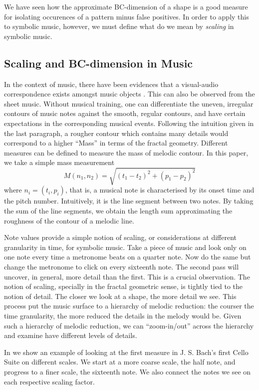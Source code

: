   We have seen how the approximate BC-dimension of a shape is a good
measure for isolating occurences of a pattern minus false positives.
In order to apply this to symbolic music, however, we must define what
do we mean by \emph{scaling} in symbolic music.

\subsection{Scaling and BC-dimension in Music}
In the context of music, there have been evidences that a visual-audio correspondence exists amongst music objects \cite{thorpe2016perception}.
This can also be observed from the sheet music.
Without musical training, one can differentiate the uneven, irregular contours of music notes against the smooth, regular contours, and have certain expectations in the corresponding musical events.
Following the intuition given in the last paragraph, a rougher contour which contains many details would correspond to a higher ``Mass'' in terms of the fractal geometry.
Different measures can be defined to measure the mass of melodic contour.
In this paper, we take a simple mass measurement
$$M(n_1, n_2) = \sqrt{(t_1-t_2)^2 +(p_1-p_2)^2}$$
  where $n_i=(t_i, p_i)$, that is, a musical note is characterised by its onset time and the pitch number. 
Intuitively, it is the line segment between two notes.
By taking the sum of the line segments, we obtain the length sum approximating the roughness of the contour of a melodic line.

Note values provide a simple notion of scaling, or considerations at different
granularity in time, for symbolic music.
Take a piece of music and look only on one note every time a metronome
beats on a quarter note. Now do the same but change the metronome to
click on every sixteenth note. The second pass will uncover, in general,
more detail than the first. This is a crucial observation. The notion
of scaling, specially in the fractal geometric sense, is tightly tied
to the notion of detail. The closer we look at a shape, the more detail we see.
This process put the music surface to a hierarchy of melodic reduction: the
courser the time granularity, the more reduced the details in the melody would be. 
Given such a hierarchy of melodic reduction, we can ``zoom-in/out'' across the hierarchy and examine have different levels of details.

  In  we show an example of looking at the first
measure in J. S. Bach's first Cello Suite on different scales. We start at 
a more coarse scale, the half note, and progress to a finer scale, the sixteenth note.
We also connect the notes we see on each respective scaling factor.

